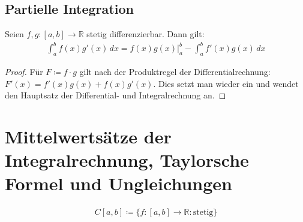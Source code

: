 \documentclass[ngerman,titlepage,twoside, parskip=half*]{scrreprt}
\newcommand*{\R}{\mathbb{R}}
\theoremstyle{break}
\theoremstyle{nonumberbreak}
\newtheorem{proof}{Beweis:}
\begin{document}
\subsection{Partielle Integration}

Seien $f,g\colon[a,b]\rightarrow\R$ stetig differenzierbar. Dann gilt:
\begin{gather*}
  \int_{a}^{b} f(x)g'(x)\,dx= f(x)g(x)\Big|_{a}^{b} -\int_{a}^{b} f'(x)g(x)\,dx
\end{gather*}
\begin{proof}
  Für $F\coloneqq f\cdot g$ gilt nach der Produktregel der
  Differentialrechnung: $F'(x)= f'(x)g(x)+f(x)g'(x)$. Dies setzt man wieder
  ein und wendet den Hauptsatz der Differential- und Integralrechnung an.
\end{proof}

\section{Mittelwertsätze der Integralrechnung, Taylorsche Formel und
  Ungleichungen}

\begin{gather*}
  C[a,b]\coloneqq\{f\colon[a,b]\rightarrow\R \colon \text{stetig}\}
\end{gather*}
\end{document}
